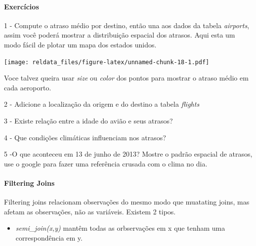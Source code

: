 \documentclass[
]{article}
\newenvironment{Shaded}{\begin{snugshade}}{\end{snugshade}}
\newcommand{\KeywordTok}[1]{\textcolor[rgb]{0.13,0.29,0.53}{\textbf{#1}}}
\newcommand{\NormalTok}[1]{#1}
\newcommand{\OperatorTok}[1]{\textcolor[rgb]{0.81,0.36,0.00}{\textbf{#1}}}
\newcommand{\StringTok}[1]{\textcolor[rgb]{0.31,0.60,0.02}{#1}}
\providecommand{\tightlist}{%
  \setlength{\itemsep}{0pt}\setlength{\parskip}{0pt}}
\begin{document}
\hypertarget{exercuxedcios-2}{%
\paragraph{Exercícios}\label{exercuxedcios-2}}

1 - Compute o atraso médio por destino, então una aos dados da tabela
\emph{airports}, assim você poderá mostrar a distribuição espacial dos
atrasos. Aqui esta um modo fácil de plotar um mapa dos estados unidos.

\begin{Shaded}
\end{Shaded}

\texttt{[image: reldata\_files/figure-latex/unnamed-chunk-18-1.pdf]}

Voce talvez queira usar \emph{size} ou \emph{color} dos pontos para
mostrar o atraso médio em cada aeroporto.

2 - Adicione a localização da origem e do destino a tabela
\emph{flights}

3 - Existe relação entre a idade do avião e seus atrasos?

4 - Que condições climáticas influenciam nos atrasos?

5 -O que aconteceu em 13 de junho de 2013? Mostre o padrão espacial de
atrasos, use o google para fazer uma referência crusada com o clima no
dia.

\hypertarget{filtering-joins}{%
\paragraph{Filtering Joins}\label{filtering-joins}}

Filtering joins relacionam observações do mesmo modo que muatating
joins, mas afetam as observações, não as variáveis. Existem 2 tipos.

\begin{itemize}
\tightlist
\item
  \emph{semi\_join(x,y)} mantêm todas as orbservações em x que tenham
  uma correspondência em y.
\end{itemize}
\end{document}
